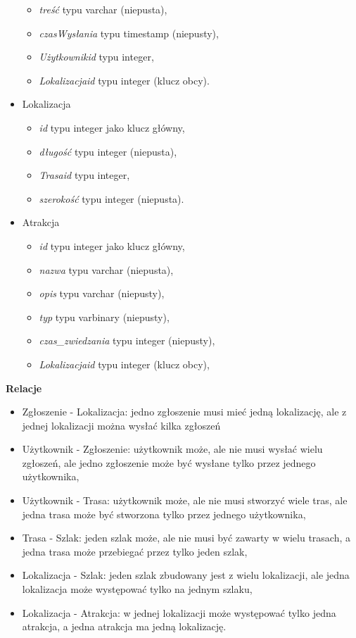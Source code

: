 \begin{itemize}
\begin{itemize}
            \item \textit{treść} typu varchar (niepusta),
            \item \textit{czasWysłania} typu timestamp (niepusty),
            \item \textit{Użytkownikid} typu integer,
            \item \textit{Lokalizacjaid} typu integer (klucz obcy).
        \end{itemize}
        \item []Lokalizacja
        \begin{itemize}
            \item \textit{id} typu integer jako klucz główny,
            \item \textit{długość} typu integer (niepusta),
            \item \textit{Trasaid} typu integer,
            \item \textit{szerokość} typu integer (niepusta).
        \end{itemize}
        \item []Atrakcja
        \begin{itemize}
            \item \textit{id} typu integer jako klucz główny,
            \item \textit{nazwa} typu varchar (niepusta),
            \item \textit{opis} typu varchar (niepusty),
            \item \textit{typ} typu varbinary (niepusty),
            \item \textit{czas\_zwiedzania} typu integer (niepusty),
            \item \textit{Lokalizacjaid} typu integer (klucz obcy),
        \end{itemize}
    \end{itemize}
    
    \textbf{Relacje}
    \begin{itemize}
        \item Zgłoszenie - Lokalizacja: jedno zgłoszenie musi mieć jedną lokalizację, ale z jednej lokalizacji można wysłać kilka zgłoszeń
        \item Użytkownik - Zgłoszenie: użytkownik może, ale nie musi wysłać wielu zgłoszeń, ale jedno zgłoszenie może być wysłane tylko przez jednego użytkownika,
        \item Użytkownik - Trasa: użytkownik może, ale nie musi stworzyć wiele tras, ale jedna trasa może być stworzona tylko przez jednego użytkownika,
        \item Trasa - Szlak: jeden szlak może, ale nie musi być zawarty w wielu trasach, a jedna trasa może przebiegać przez tylko jeden szlak,
        \item Lokalizacja - Szlak: jeden szlak zbudowany jest z wielu lokalizacji, ale jedna lokalizacja może występować tylko na jednym szlaku,
        \item Lokalizacja - Atrakcja: w jednej lokalizacji może występować tylko jedna atrakcja, a jedna atrakcja ma jedną lokalizację.
    \end{itemize}

